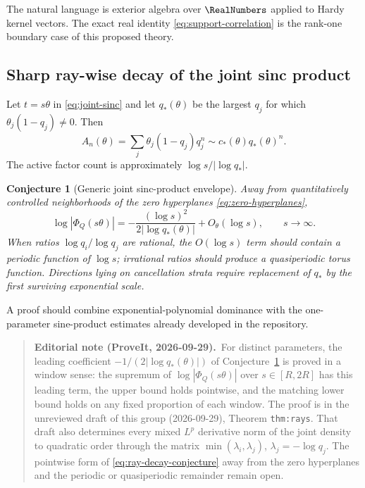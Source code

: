 \documentclass[11pt,a4paper]{article}
\newtheorem{conjecture}[theorem]{Conjecture}
\theoremstyle{definition}
\theoremstyle{remark}
\begin{document}
The natural language is exterior algebra over $\RealNumbers$ applied to Hardy kernel vectors.  The exact real identity \eqref{eq:support-correlation} is the rank-one boundary case of this proposed theory.

\subsection{Sharp ray-wise decay of the joint sinc product}

Let $t=s\theta$ in \eqref{eq:joint-sinc} and let $q_*(\theta)$ be the largest $q_j$ for which $\theta_j(1-q_j)\ne0$.  Then
\[
 A_n(\theta)=\sum_j\theta_j(1-q_j)q_j^n
  \sim c_*(\theta)q_*(\theta)^n.
\]
The active factor count is approximately $\log s/|\log q_*|$.

\begin{conjecture}[Generic joint sinc-product envelope]
\label{conj:ray-decay}
Away from quantitatively controlled neighborhoods of the zero hyperplanes \eqref{eq:zero-hyperplanes},
\begin{equation}
  \log|\Phi_Q(s\theta)|
   =-\frac{(\log s)^2}{2|\log q_*(\theta)|}
     +O_\theta(\log s),
  \qquad s\to\infty.
  \label{eq:ray-decay-conjecture}
\end{equation}
When ratios $\log q_i/\log q_j$ are rational, the $O(\log s)$ term should contain a periodic function of $\log s$; irrational ratios should produce a quasiperiodic torus function.  Directions lying on cancellation strata require replacement of $q_*$ by the first surviving exponential scale.
\end{conjecture}

A proof should combine exponential-polynomial dominance with the one-parameter sine-product estimates already developed in the repository.
\begin{quote}\small\raggedright
\textbf{Editorial note (ProveIt, 2026-09-29).}\
For distinct parameters, the leading coefficient
$-1/(2|\log q_*(\theta)|)$ of Conjecture~\ref{conj:ray-decay} is proved in
a window sense: the supremum of $\log|\Phi_Q(s\theta)|$ over $s\in[R,2R]$
has this leading term, the upper bound holds pointwise, and the matching
lower bound holds on any fixed proportion of each window.  The proof is in
the unreviewed draft
 of this group
(2026-09-29), Theorem \texttt{thm:rays}.  That draft also determines every
mixed $L^p$ derivative norm of the joint density to quadratic order through
the matrix $\min(\lambda_i,\lambda_j)$, $\lambda_j=-\log q_j$.  The
pointwise form of \eqref{eq:ray-decay-conjecture} away from the zero
hyperplanes and the periodic or quasiperiodic remainder remain open.
\end{quote}
\end{document}
